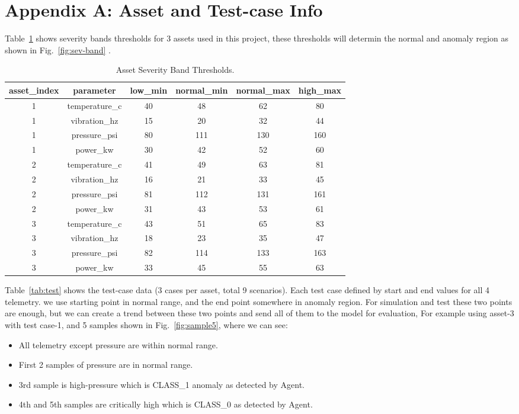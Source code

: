 \documentclass[stu, 12pt, floatsintext]{apa7}
\begin{document}
\section{Appendix A: Asset and Test-case Info}\label{app:a}
Table~\ref{tab:asset}  shows severity bands thresholds for 3 assets used in this project, these thresholds will determin the normal and anomaly region as shown in Fig.~\ref{fig:sev-band} .
\begin{table}[!htb]
	\centering
	\caption{Asset Severity Band  Thresholds.}
	\label{tab:asset}
	\begin{tabular}{cccccc}
		\toprule
		\textbf{asset\_index} & \textbf{parameter} & \textbf{low\_min} & \textbf{normal\_min} & \textbf{normal\_max} & \textbf{high\_max} \\
		\hline\hline
		1 & temperature\_c & 40 & 48 & 62 & 80 \\
		1 & vibration\_hz & 15 & 20 & 32 & 44 \\
		1 & pressure\_psi & 80 & 111 & 130 & 160 \\
		1 & power\_kw & 30 & 42 & 52 & 60 \\		
		\hline\hline
		2 & temperature\_c & 41 & 49 & 63 & 81 \\
		2 & vibration\_hz & 16 & 21 & 33 & 45 \\
		2 & pressure\_psi & 81 & 112 & 131 & 161 \\
		2 & power\_kw & 31 & 43 & 53 & 61 \\		
		\midrule\midrule
		3 & temperature\_c & 43 & 51 & 65 & 83 \\
		3 & vibration\_hz & 18 & 23 & 35 & 47 \\
		3 & pressure\_psi & 82 & 114 & 133 & 163 \\
		3 & power\_kw & 33 & 45 & 55 & 63 \\		
		\bottomrule
	\end{tabular}
\end{table}

Table~\ref{tab:test} shows the test-case data (3 cases per asset, total 9 scenarios). Each test case defined by start and end values for all 4 telemetry. we use starting point in normal range, and the end point somewhere in anomaly region.  For simulation and test these two points are enough, but we can create a trend between these two points and send all of them to the model for evaluation, For example using asset-3 with test case-1, and 5 samples shown in Fig.~\ref{fig:sample5}, where we can see:
\begin{itemize}
	\item All telemetry except pressure are within normal range.
	\item First 2 samples of pressure are in normal range.
	\item 3rd sample is high-pressure which is CLASS\_1  anomaly as detected by Agent.
	\item 4th and 5th samples are critically high which is CLASS\_0 as detected by Agent.
\end{itemize} 
\end{document}

